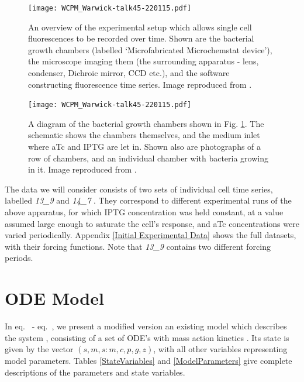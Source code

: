 \documentclass[10pt,journal]{./IEEE_latex_class/IEEEtran}
\renewcommand{\eqref}{eq.~\originaleqref}
\begin{document}
\begin{figure}
    \centering
		\texttt{[image: WCPM\_Warwick-talk45-220115.pdf]}
        \caption{An overview of the experimental setup which allows single cell fluorescences to be recorded over time. Shown are the bacterial growth chambers (labelled `Microfabricated Microchemstat device'), the microscope imaging them (the surrounding apparatus - lens, condenser, Dichroic mirror, CCD etc.), and the software constructing fluorescence time series. Image reproduced from \cite{Jaramillo}. }
            \label{ExperimentalSetup_overview}
\end{figure}
\begin{figure}
    \centering
	\texttt{[image: WCPM\_Warwick-talk45-220115.pdf]}
        \caption{A diagram of the bacterial growth chambers shown in Fig. \ref{ExperimentalSetup_overview}. The schematic shows the chambers themselves, and the medium inlet where aTc and IPTG are let in. Shown also are photographs of a row of chambers, and an individual chamber with bacteria growing in it. Image reproduced from \cite{Jaramillo}.}
    \label{ExperimentalSetup_chambers}
\end{figure}

The data we will consider consists of two sets of individual cell time series, labelled \textit{13\_9} and \textit{14\_7} \cite{Jaramilloa}. They correspond to different experimental runs of the above apparatus, for which IPTG concentration was held constant, at a value assumed large enough to saturate the cell's response, and aTc concentrations were varied periodically. Appendix \ref{Initial  Experimental Data} shows the full datasets, with their forcing functions. Note that \textit{13\_9} contains two different forcing periods.




\section{ODE Model}
\label{ODEModel}

In \eqref{eq:s} - \eqref{eq:z}, we present a modified version an existing model which describes the system \cite{Jaramilloa}, consisting of a set of ODE's with mass action kinetics \cite{UriAlon}.  Its state is given by the vector $(s,m,s:m,c,p,g,z)$, with all other variables representing model parameters. Tables \ref{StateVariables} and \ref{ModelParameters} give complete descriptions of the parameters and state variables.
 
\end{document}
